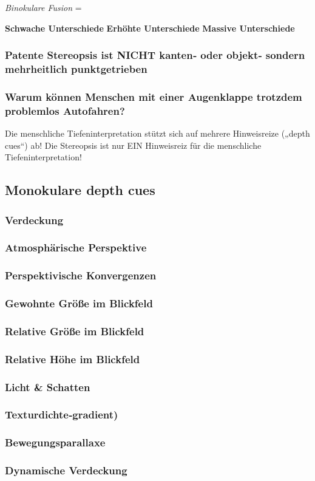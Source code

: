\textit{Binokulare Fusion} =

\textbf{Schwache Unterschiede}
\textbf{Erhöhte Unterschiede}
\textbf{Massive Unterschiede}



\subsubsection{Patente Stereopsis ist NICHT kanten‐ oder objekt‐ sondern mehrheitlich punktgetrieben}

\subsubsection{Warum können Menschen mit einer Augenklappe trotzdem problemlos Autofahren?}
Die menschliche Tiefeninterpretation stützt sich auf mehrere Hinweisreize („depth cues“) ab!
Die Stereopsis ist nur EIN Hinweisreiz für die menschliche Tiefeninterpretation!\\


\subsection{Monokulare depth cues}

\subsubsection{Verdeckung}
\subsubsection{Atmosphärische Perspektive}
\subsubsection{Perspektivische Konvergenzen}
\subsubsection{Gewohnte Größe im Blickfeld}
\subsubsection{Relative Größe im Blickfeld}
\subsubsection{Relative Höhe im Blickfeld}
\subsubsection{Licht \& Schatten}
\subsubsection{Texturdichte‐gradient)}
\subsubsection{Bewegungsparallaxe}
\subsubsection{Dynamische Verdeckung}





